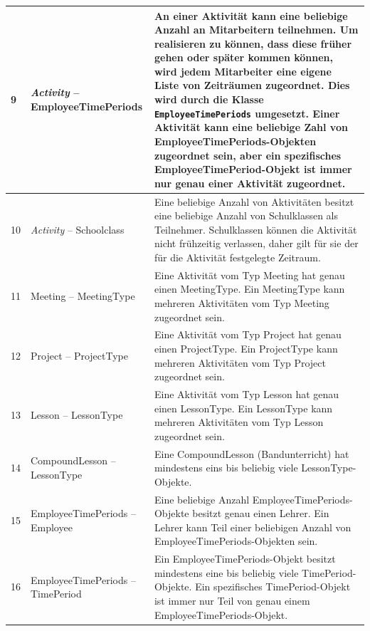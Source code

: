 \documentclass[fontsize=12pt,paper=a4,twoside]{scrartcl}
\begin{document}
\begin{tabularx}{\textwidth}{|p{0.6cm}|p{5cm}|X|}
\hline
9 	& \textit{Activity} -- EmployeeTimePeriods		& An einer Aktivität kann eine beliebige
	Anzahl an Mitarbeitern teilnehmen. Um realisieren zu können, dass diese früher gehen oder später kommen können, wird jedem Mitarbeiter eine eigene Liste von Zeiträumen zugeordnet. Dies wird durch die Klasse \texttt{EmployeeTimePeriods} umgesetzt. Einer Aktivität kann eine beliebige Zahl von EmployeeTimePeriods-Objekten zugeordnet sein, aber ein spezifisches EmployeeTimePeriod-Objekt ist immer nur genau einer Aktivität zugeordnet. \\\hline
10	& \textit{Activity} -- Schoolclass				& Eine beliebige Anzahl von Aktivitäten
	besitzt eine beliebige Anzahl von Schulklassen als Teilnehmer. Schulklassen können die Aktivität nicht
	frühzeitig verlassen, daher gilt für sie der für die Aktivität festgelegte Zeitraum.\\\hline
11	& Meeting -- MeetingType 			 & Eine Aktivität vom Typ Meeting hat genau einen
	MeetingType. Ein MeetingType kann mehreren Aktivitäten vom Typ Meeting zugeordnet sein. \\\hline
12	& Project -- ProjectType			& Eine Aktivität vom Typ Project hat genau einen
	ProjectType. Ein ProjectType kann mehreren Aktivitäten vom Typ Project zugeordnet sein. \\\hline
13	& Lesson -- LessonType				& Eine Aktivität vom Typ Lesson hat genau einen
	LessonType. Ein LessonType kann mehreren Aktivitäten vom Typ Lesson zugeordnet sein. \\\hline
14	& CompoundLesson -- LessonType & Eine CompoundLesson (Bandunterricht) hat mindestens eins bis 
	beliebig viele LessonType-Objekte. \\\hline
15 	& EmployeeTimePeriods -- Employee 				& Eine beliebige Anzahl
	EmployeeTimePeriods-Objekte besitzt genau einen Lehrer. Ein Lehrer kann Teil einer beliebigen Anzahl von EmployeeTimePeriods-Objekten sein. \\\hline
16	& EmployeeTimePeriods -- TimePeriod 			& Ein EmployeeTimePeriods-Objekt besitzt
	mindestens eine bis beliebig viele TimePeriod-Objekte. Ein spezifisches TimePeriod-Objekt ist immer nur Teil von genau einem EmployeeTimePeriods-Objekt. \\\hline
\end{tabularx}
\end{document}
